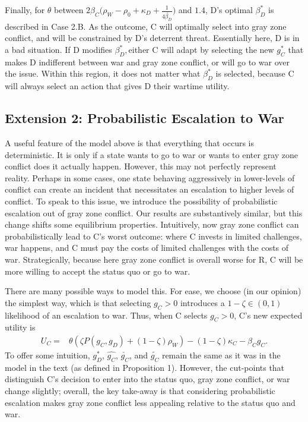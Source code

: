 \documentclass[
]{article}
\begin{document}
Finally, for \(\theta\) between \(\ensuremath{2\beta_{C}(\rho_{W}-\ensuremath{\rho_{0}}+\kappa_{D}}+\frac{1}{4\check{\beta_{D}}})\) and \(1.4\), D's optimal \(\beta_{D}^{*}\) is described in Case 2.B. As the outcome, C will optimally select into gray zone conflict, and will be constrained by D's deterrent threat. Essentially here, D is in a bad situation. If D modifies \(\beta_{D}^{*},\)either C will adapt by selecting the new \(g_{C}^{*}\) that makes D indifferent between war and gray zone conflict, or will go to war over the issue. Within this region, it does not matter what \(\beta_{D}^{*}\) is selected, because C will always select an action that gives D their wartime utility.

\hypertarget{extension-2-probabilistic-escalation-to-war}{%
\subsection{Extension 2: Probabilistic Escalation to War}\label{extension-2-probabilistic-escalation-to-war}}

A useful feature of the model above is that everything that occurs is deterministic. It is only if a state wants to go to war or wants to enter gray zone conflict does it actually happen. However, this may not perfectly represent reality. Perhaps in some cases, one state behaving aggressively in lower-levels of conflict can create an incident that necessitates an escalation to higher levels of conflict. To speak to this issue, we introduce the possibility of probabilistic escalation out of gray zone conflict. Our results are substantively similar, but this change shifts some equilibrium properties. Intuitively, now gray zone conflict can probabilistically lead to C's worst outcome: where C invests in limited challenges, war happens, and C must pay the costs of limited challenges with the costs of war. Strategically, because here gray zone conflict is overall worse for R, C will be more willing to accept the status quo or go to war.

There are many possible ways to model this. For ease, we choose (in our opinion) the simplest way, which is that selecting \(g_{C}>0\) introduces a \(1-\zeta\in(0,1)\) likelihood of an escalation to war. Thus, when C selects \(g_{C}>0\), C's new expected utility is
\begin{align*}
  U_{C}= & \theta\left(\zeta P(g_{C},g_{D})+(1-\zeta)\rho_{W}\right)-(1-\zeta)\kappa_{C}-\beta_{C}g_{C}.
  \end{align*}
To offer some intuition, \(g_{D}^{*}\), \(\hat{g_{C}}\), \(\check{g_{C}}\), and \(\tilde{g_{C}}\) remain the same as it was in the model in the text (as defined in Proposition 1). However, the cut-points that distinguish C's decision to enter into the status quo, gray zone conflict, or war change slightly; overall, the key take-away is that considering probabilistic escalation makes gray zone conflict less appealing relative to the status quo and war.
\end{document}

